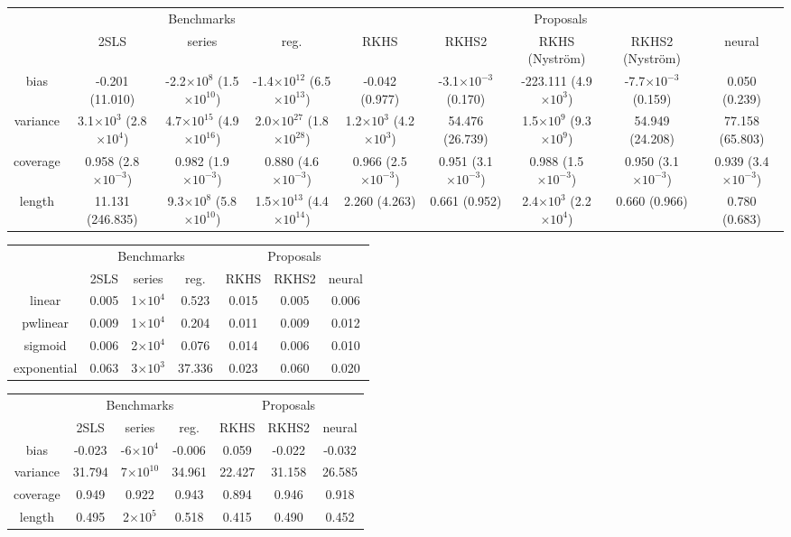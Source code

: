 \begin{tabular}{ccccccccc}
    & \multicolumn{3}{c}{Benchmarks} & \multicolumn{5}{c}{Proposals} \tabularnewline
    \cmidrule(lr){2-4}\cmidrule(lr){5-9}
     & 2SLS & series & reg. & RKHS & RKHS2 & RKHS (Nyström) & RKHS2 (Nyström) & neural \tabularnewline
    \hline
    bias & -0.201 (11.010) & -2.2$\times 10^{8}$ (1.5$\times 10^{10}$) & -1.4$\times 10^{12}$ (6.5$\times 10^{13}$) & -0.042 (0.977) & -3.1$\times 10^{-3}$ (0.170) & -223.111 (4.9$\times 10^{3}$) & -7.7$\times 10^{-3}$ (0.159) & 0.050 (0.239) \tabularnewline
    variance & 3.1$\times 10^{3}$ (2.8$\times 10^{4}$) & 4.7$\times 10^{15}$ (4.9$\times 10^{16}$) & 2.0$\times 10^{27}$ (1.8$\times 10^{28}$) & 1.2$\times 10^{3}$ (4.2$\times 10^{3}$) & 54.476 (26.739) & 1.5$\times 10^{9}$ (9.3$\times 10^{9}$) & 54.949 (24.208) & 77.158 (65.803) \tabularnewline
    coverage & 0.958 (2.8$\times 10^{-3}$) & 0.982 (1.9$\times 10^{-3}$) & 0.880 (4.6$\times 10^{-3}$) & 0.966 (2.5$\times 10^{-3}$) & 0.951 (3.1$\times 10^{-3}$) & 0.988 (1.5$\times 10^{-3}$) & 0.950 (3.1$\times 10^{-3}$) & 0.939 (3.4$\times 10^{-3}$) \tabularnewline
    length & 11.131 (246.835) & 9.3$\times 10^{8}$ (5.8$\times 10^{10}$) & 1.5$\times 10^{13}$ (4.4$\times 10^{14}$) & 2.260 (4.263) & 0.661 (0.952) & 2.4$\times 10^{3}$ (2.2$\times 10^{4}$) & 0.660 (0.966) & 0.780 (0.683) \tabularnewline
    \hline
\end{tabular}

\begin{tabular}{ccccccc}
    & \multicolumn{3}{c}{Benchmarks} & \multicolumn{3}{c}{Proposals} \tabularnewline
    \cmidrule(lr){2-4}\cmidrule(lr){5-7}
     & 2SLS & series & reg. & RKHS & RKHS2 & neural \tabularnewline
    \hline
    linear & 0.005 & 1$\times 10^{4}$ & 0.523 & 0.015 & 0.005 & 0.006 \tabularnewline
    pwlinear & 0.009 & 1$\times 10^{4}$ & 0.204 & 0.011 & 0.009 & 0.012 \tabularnewline
    sigmoid & 0.006 & 2$\times 10^{4}$ & 0.076 & 0.014 & 0.006 & 0.010 \tabularnewline
    exponential & 0.063 & 3$\times 10^{3}$ & 37.336 & 0.023 & 0.060 & 0.020 \tabularnewline
    \hline
\end{tabular}

\begin{tabular}{ccccccc}
    & \multicolumn{3}{c}{Benchmarks} & \multicolumn{3}{c}{Proposals} \tabularnewline
    \cmidrule(lr){2-4}\cmidrule(lr){5-7}
     & 2SLS & series & reg. & RKHS & RKHS2 & neural \tabularnewline
    \hline
    bias & -0.023 & -6$\times 10^{4}$ & -0.006 & 0.059 & -0.022 & -0.032 \tabularnewline
    variance & 31.794 & 7$\times 10^{10}$ & 34.961 & 22.427 & 31.158 & 26.585 \tabularnewline
    coverage & 0.949 & 0.922 & 0.943 & 0.894 & 0.946 & 0.918 \tabularnewline
    length & 0.495 & 2$\times 10^{5}$ & 0.518 & 0.415 & 0.490 & 0.452 \tabularnewline
    \hline
\end{tabular}

